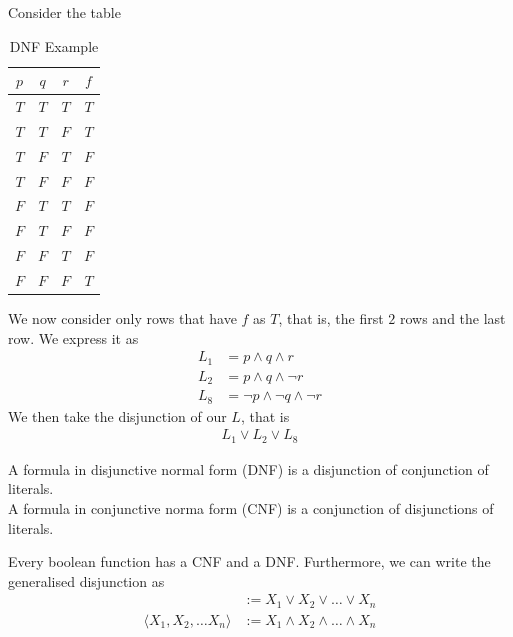 \documentclass[a4paper]{article}
\theoremstyle{plain}
\newtheorem{thm}{Theorem}[section]
\theoremstyle{definition}
\newtheorem{defn}{Definition}[section]
\newtheorem{exmp}{Example}[section]
\theoremstyle{remark}
\begin{document}
\begin{tcolorbox}[colback=black!3!white,colframe=black!60!white,title=\begin{exmp}DNF Example \label{DNF Example}\end{exmp}]
        Consider the table
	\begin{table}[H]
		\centering
		\caption{DNF Example}
		\label{tab:dnf}
		\begin{tabular}{ccc||c}
		$p$& $q$ & $r$ & $f$ \\
		\hline
		$T$ & $T$ & $T$ & $T$ \\
		$T$ & $T$ & $F$ & $T$ \\
		$T$ & $F$ & $T$ & $F$ \\
		$T$ & $F$ & $F$ & $F$ \\
		$F$ & $T$ & $T$ & $F$ \\
		$F$ & $T$ & $F$ & $F$ \\
		$F$ & $F$ & $T$ & $F$ \\
		$F$ & $F$ & $F$ & $T$ 
		\end{tabular}
	\end{table}
	We now consider only rows that have $f$ as $T$, that is, the first $2$ rows and the last row. We express it as
	\begin{align*}
		L_1 &= p \land q \land r \\
		L_2 &= p \land q \land \neg r \\
		L_8 &= \neg p \land \neg q \land \neg r
	\end{align*}
	We then take the disjunction of our $L$, that is
	\begin{align*}
		L_1 \lor L_2 \lor L_8
	\end{align*}
\end{tcolorbox}
\begin{tcolorbox}[colback=black!3!white,colframe=black!60!white,title=\begin{defn}Normal Forms \label{Normal Forms}\end{defn}]
A formula in disjunctive normal form (DNF) is a disjunction of conjunction of literals. \\
A formula in conjunctive norma form (CNF) is a conjunction of disjunctions of literals.
\end{tcolorbox}
\begin{tcolorbox}[colback=black!3!white,colframe=black!60!white,title=\begin{thm}Normal Form Presence \label{Normal Form Presence}\end{thm}]
	Every boolean function has a CNF and a DNF. Furthermore, we can write the generalised disjunction as
	\begin{align}
		[X_1,X_2,\ldots X_n] &:= X_1 \lor X_2 \lor \ldots \lor X_n \\
		\langle X_1,X_2,\ldots X_n \rangle &:= X_1 \land X_2 \land \ldots \land X_n
	\end{align}
\end{tcolorbox}
\end{document}
